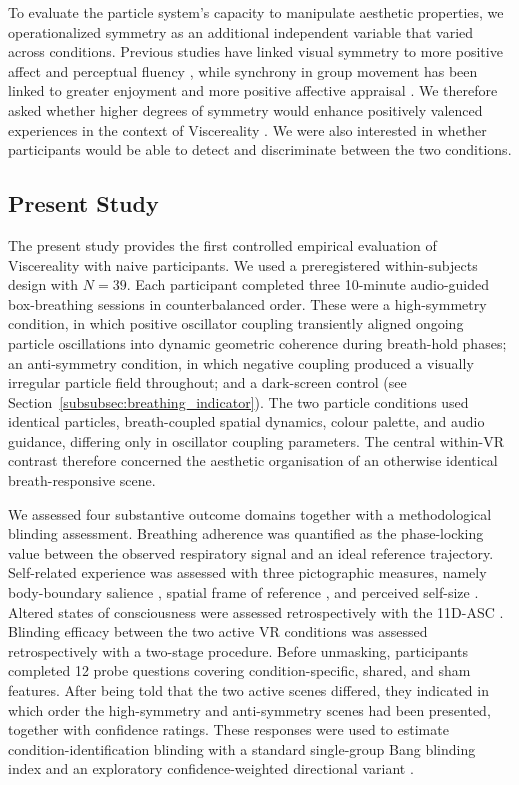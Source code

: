 To evaluate the particle system's capacity to manipulate aesthetic properties, we operationalized symmetry as an additional independent variable that varied across conditions. Previous studies have linked visual symmetry to more positive affect and perceptual fluency \citep{Bertamini2013, Pecchinenda2014, Makin2012}, while synchrony in group movement has been linked to greater enjoyment and more positive affective appraisal \citep{Vicary2017, Mogan2017}. We therefore asked whether higher degrees of symmetry would enhance positively valenced experiences in the context of Viscereality \citep{johnson2023qualia}. We were also interested in whether participants would be able to detect and discriminate between the two conditions.
 

\subsection{Present Study}

The present study provides the first controlled empirical evaluation of Viscereality with naive participants. We used a preregistered within-subjects design with $N = 39$. Each participant completed three 10-minute audio-guided box-breathing sessions in counterbalanced order. These were a high-symmetry condition, in which positive oscillator coupling transiently aligned ongoing particle oscillations into dynamic geometric coherence during breath-hold phases; an anti-symmetry condition, in which negative coupling produced a visually irregular particle field throughout; and a dark-screen control (see Section~\ref{subsubsec:breathing_indicator}). The two particle conditions used identical particles, breath-coupled spatial dynamics, colour palette, and audio guidance, differing only in oscillator coupling parameters. The central within-VR contrast therefore concerned the aesthetic organisation of an otherwise identical breath-responsive scene.

We assessed four substantive outcome domains together with a methodological blinding assessment. Breathing adherence was quantified as the phase-locking value between the observed respiratory signal and an ideal reference trajectory. Self-related experience was assessed with three pictographic measures, namely body-boundary salience \citep{Dambrun2016}, spatial frame of reference \citep{Hanley2019}, and perceived self-size \citep{vidal2025inducing}. Altered states of consciousness were assessed retrospectively with the 11D-ASC \citep{studerus2010, Dittrich1998}. Blinding efficacy between the two active VR conditions was assessed retrospectively with a two-stage procedure. Before unmasking, participants completed 12 probe questions covering condition-specific, shared, and sham features. After being told that the two active scenes differed, they indicated in which order the high-symmetry and anti-symmetry scenes had been presented, together with confidence ratings. These responses were used to estimate condition-identification blinding with a standard single-group Bang blinding index and an exploratory confidence-weighted directional variant \citep{Bang2004}.

